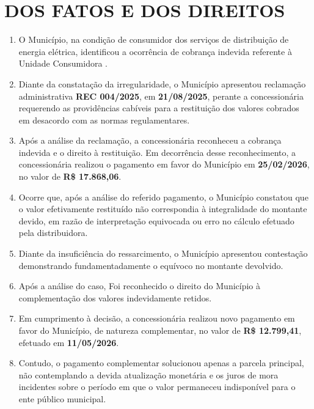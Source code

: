 \newcommand{\tipoRequerimento}{Solicitação de pagamento de ajuste}
\newcommand{\tese}{CORREÇÃO MONETÁRIA E JUROS DE PAGAMENTO}

\section{DOS FATOS E DOS DIREITOS}

\begin{enumerate}[resume]
    \item O Município, na condição de consumidor dos serviços de distribuição de energia elétrica, identificou a ocorrência de cobrança indevida referente à Unidade Consumidora \unidadeConsumidora{}.   

    \item Diante da constatação da irregularidade, o Município apresentou reclamação administrativa \textbf{REC 004/2025}, em \textbf{21/08/2025}, perante a concessionária requerendo as providências cabíveis para a restituição dos valores cobrados em desacordo com as normas regulamentares.

    \item Após a análise da reclamação, a concessionária reconheceu a cobrança indevida e o direito à restituição. Em decorrência desse reconhecimento, a concessionária realizou o pagamento em favor do Município em \textbf{25/02/2026}, no valor de \textbf{R\$ 17.868,06}.

    \item Ocorre que, após a análise do referido pagamento, o Município constatou que o valor efetivamente restituído não correspondia à integralidade do montante devido, em razão de interpretação equivocada ou erro no cálculo efetuado pela distribuidora.

    \item Diante da insuficiência do ressarcimento, o Município apresentou contestação demonstrando fundamentadamente o equívoco no montante devolvido.

    \item Após a análise do caso, Foi reconhecido o direito do Município à complementação dos valores indevidamente retidos.

    \item Em cumprimento à decisão, a concessionária realizou novo pagamento em favor do Município, de natureza complementar, no valor de \textbf{R\$ 12.799,41}, efetuado em \textbf{11/05/2026}.

    \item Contudo, o pagamento complementar solucionou apenas a parcela principal, não contemplando a devida atualização monetária e os juros de mora incidentes sobre o período em que o valor permaneceu indisponível para o ente público municipal.


\end{enumerate}
